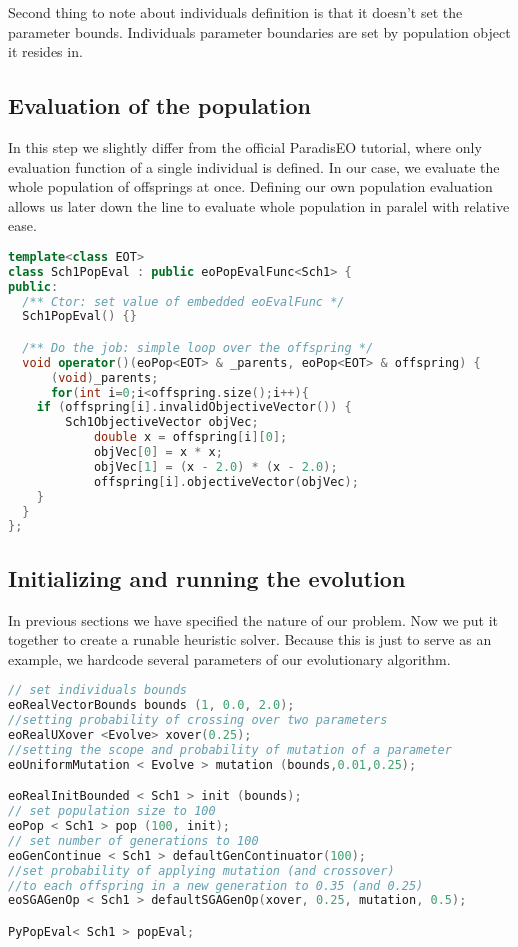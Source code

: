 \documentclass[12pt,oneside]{fithesis2}
\begin{document}
Second thing to note about individuals definition is that it doesn't set the parameter bounds. Individuals parameter boundaries are set by population object it resides in. 

\subsection{Evaluation of the population}
In this step we slightly differ from the official ParadisEO tutorial, where only evaluation function of a single individual is defined.
In our case, we evaluate the whole population of offsprings at once. Defining our own population evaluation allows us later down the line to evaluate whole population in paralel with relative ease.

\begin{lstlisting}[language=C++,label=composition,caption=Individual initialization]
template<class EOT>
class Sch1PopEval : public eoPopEvalFunc<Sch1> {
public:
  /** Ctor: set value of embedded eoEvalFunc */
  Sch1PopEval() {}

  /** Do the job: simple loop over the offspring */
  void operator()(eoPop<EOT> & _parents, eoPop<EOT> & offspring) {
      (void)_parents;
      for(int i=0;i<offspring.size();i++){
	if (offspring[i].invalidObjectiveVector()) {
	    Sch1ObjectiveVector objVec;
            double x = offspring[i][0];
            objVec[0] = x * x;
            objVec[1] = (x - 2.0) * (x - 2.0);
            offspring[i].objectiveVector(objVec);
	}
  }
};
\end{lstlisting}

\subsection{Initializing and running the evolution}
In previous sections we have specified the nature of our problem. Now we put it together to create a runable heuristic solver.
Because this is just to serve as an example, we hardcode several parameters of our evolutionary algorithm.

\begin{lstlisting}[language=C++,label=composition,caption=Individual initialization]
// set individuals bounds
eoRealVectorBounds bounds (1, 0.0, 2.0);
//setting probability of crossing over two parameters 
eoRealUXover <Evolve> xover(0.25);
//setting the scope and probability of mutation of a parameter 
eoUniformMutation < Evolve > mutation (bounds,0.01,0.25);

eoRealInitBounded < Sch1 > init (bounds);
// set population size to 100
eoPop < Sch1 > pop (100, init); 
// set number of generations to 100
eoGenContinue < Sch1 > defaultGenContinuator(100);
//set probability of applying mutation (and crossover)
//to each offspring in a new generation to 0.35 (and 0.25)
eoSGAGenOp < Sch1 > defaultSGAGenOp(xover, 0.25, mutation, 0.5);

PyPopEval< Sch1 > popEval;
\end{lstlisting}
\end{document}
